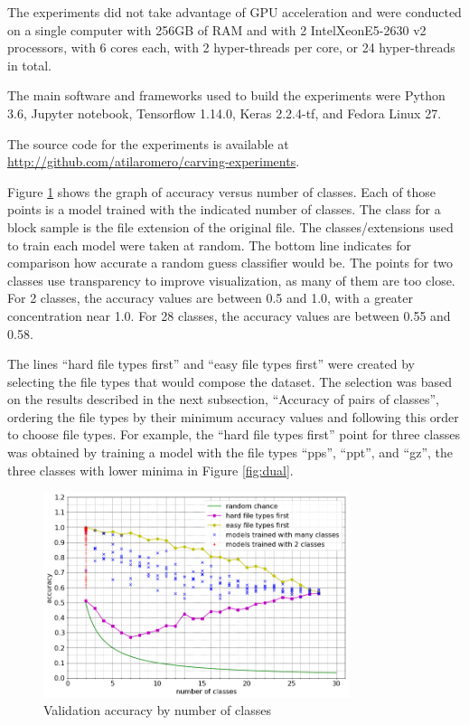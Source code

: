 The experiments did not take advantage of GPU acceleration and were  conducted on a single computer with 256GB of RAM and with 2 Intel\textregistered Xeon\textregistered E5-2630 v2 processors, with 6 cores each, with 2 hyper-threads per core, or 24 hyper-threads in total. 


The main software and frameworks used to build the experiments were Python 3.6, Jupyter notebook, Tensorflow 1.14.0, Keras 2.2.4-tf, and Fedora Linux 27.

The source code for the experiments is available at \sloppy\url{http://github.com/atilaromero/carving-experiments}.


Figure \ref{fig:nclasses} shows the graph of accuracy versus number of classes.  Each of those points is a model trained with the indicated number of classes. The class for a block sample is the file extension of the original file. The classes/extensions used to train each model were taken at random. The bottom line indicates for comparison how accurate a random guess classifier would be. The points for two classes use transparency to improve visualization, as many of them are too close. For 2 classes, the accuracy values are between 0.5 and 1.0, with a greater concentration near 1.0. For 28 classes, the accuracy values are between 0.55 and 0.58.

The lines ``hard file types first'' and ``easy file types first'' were created by selecting the file types that would compose the dataset. The selection was based on the results described in the next subsection, ``Accuracy of pairs of classes'', ordering the file types by their minimum accuracy values and following this order to choose file types. For example, the ``hard file types first'' point for three classes was obtained by training a model with the file types ``pps'', ``ppt'', and ``gz'', the three classes with lower minima in Figure \ref{fig:dual}.

\noindent
\begin{figure}[htb!]
\centering\includegraphics[width=0.8\textwidth]{content/nclasses.png}
\caption{\label{fig:nclasses}Validation accuracy by number of classes}%
\end{figure}

